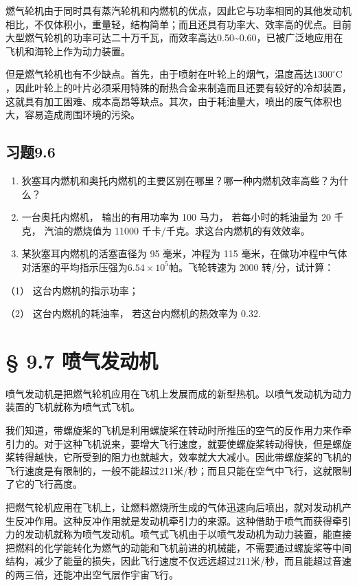 燃气轮机由于同时具有蒸汽轮机和内燃机的优点，因此它与功率相同的其他发动机相比，不仅体积小，重量轻，结构简单；而且还具有功率大、效率高的优点。目前大型燃气轮机的功率可达二十万千瓦，而效率高达0.50\textasciitilde0.60，已被广泛地应用在飞机和海轮上作为动力装置。

但是燃气轮机也有不少缺点。首先，由于喷射在叶轮上的烟气，温度高达\(1300^{\circ}\mathrm{C}\)，因此叶轮上的叶片必须采用特殊的耐热合金来制造而且还要有较好的冷却装置，这就具有加工困难、成本高昂等缺点。其次，由于耗油量大，喷出的废气体积也大，容易造成周围环境的污染。

\subsection{习题9.6}\label{ux4e60ux98989.6}

\begin{enumerate}
\def\labelenumi{\arabic{enumi}.}
\item
  狄塞耳内燃机和奥托内燃机的主要区别在哪里？哪一种内燃机效率高些？为什么？
\item
  一台奥托内燃机， 输出的有用功率为 100 马力， 若每小时的耗油量为 20
  千克， 汽油的燃烧值为 11000 千卡/千克。求这台内燃机的有效效率。
\item
  某狄塞耳内燃机的活塞直径为 95 毫米，冲程为 115
  毫米，在做功冲程中气体对活塞的平均指示压强为\(6.54 \times 10^{5}\)帕。飞轮转速为
  2000 转/分，试计算：
\end{enumerate}

（1） 这台内燃机的指示功率；

（2） 这台内燃机的耗油率， 若这台内燃机的热效率为 0.32.

\section{§ 9.7 喷气发动机}\label{ux55b7ux6c14ux53d1ux52a8ux673a}

喷气发动机是把燃气轮机应用在飞机上发展而成的新型热机。以喷气发动机为动力装置的飞机就称为喷气式飞机。

我们知道，带螺旋桨的飞机是利用螺旋桨在转动时所推压的空气的反作用力来作牵引力的。对于这种飞机说来，要增大飞行速度，就要使螺旋桨转动得快，但是螺旋桨转得越快，它所受到的阻力也就越大，效率就大大减小。因此带螺旋桨的飞机的飞行速度是有限制的，一般不能超过211米/秒；而且只能在空气中飞行，这就限制了它的飞行高度。

把燃气轮机应用在飞机上，让燃料燃烧所生成的气体迅速向后喷出，就对发动机产生反冲作用。这种反冲作用就是发动机牵引力的来源。这种借助于喷气而获得牵引力的发动机就称为喷气发动机。喷气式飞机由于以喷气发动机为动力装置，能直接把燃料的化学能转化为燃气的动能和飞机前进的机械能，不需要通过螺旋桨等中间结构，减少了能量的损失，因此飞行速度不仅远远超过211米/秒，而且能超过音速的两三倍，还能冲出空气层作宇宙飞行。

